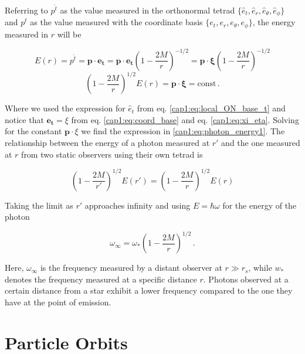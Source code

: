 Referring to $p^{\hat t}$ as the value measured in the orthonormal tetrad
$\{\hat e_t, \hat e_r, \hat e_\theta, \hat e_\phi \}$ and
$p^t$ as the value measured with the coordinate basis
$\{e_{t}, e_{r}, e_{\theta}, e_{\phi} \}$, the energy measured in $r$ will be

\begin{equation*}
    E(r) = p^{\hat t} = \mathbf{p \cdot \hat e_t}
    = \mathbf{p \cdot e_t} \left(1 - \frac{2M}{r} \right)^{-1/2}
    = \mathbf{p \cdot \xi} \left(1 - \frac{2M}{r} \right)^{-1/2}
\end{equation*}
\begin{equation}
    \left(1 - \frac{2M}{r} \right)^{1/2} E(r) = \mathbf{p \cdot \xi}
    = \text{const} \, .
    \label{cap1:eq:photon_energy1}
\end{equation}

Where we used the expression for $\hat e_t$ from eq.
\ref{cap1:eq:local_ON_base_t}
and notice that $\mathbf{e_t} = \xi$ from eq. \ref{cap1:eq:coord_base} and eq.
\ref{cap1:eq:xi_eta}. 
Solving for the constant $\mathbf{p} \cdot \xi$ we find the expression in
\ref{cap1:eq:photon_energy1}. The relationship between the energy of a photon
measured at $r'$ and the one measured at $r$ from two static observers using
their own tetrad is

\begin{equation*}
    \left(1 - \frac{2M}{r'} \right)^{1/2} E(r')
    = \left(1 - \frac{2M}{r} \right)^{1/2} E(r)
\end{equation*}

Taking the limit as $r'$ approaches infinity and using $E = \hbar \omega$ for
the energy of the photon

\begin{equation}
    \omega_\infty = \omega_* \left(1 - \frac{2M}{r} \right)^{1/2} \, .
    \label{cap1:eq:redshift}
\end{equation}

Here, $\omega_\infty$ is the frequency measured by a distant observer at
$r \gg r_s$, while $w_*$ denotes the frequency measured at a specific distance
$r$.
Photons observed at a certain distance from a star exhibit a lower frequency
compared to the one they have at the point of emission.


\section{Particle Orbits}
\label{cap1:sec:particle_orbits}

